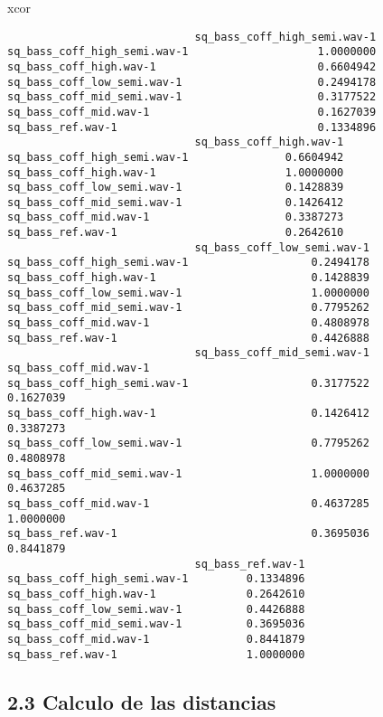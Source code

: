 \documentclass[
]{article}
\newenvironment{Shaded}{\begin{snugshade}}{\end{snugshade}}
\newcommand{\NormalTok}[1]{#1}
\begin{document}
\begin{Shaded}
\begin{Highlighting}[]
\NormalTok{xcor }
\end{Highlighting}
\end{Shaded}

\begin{verbatim}
                             sq_bass_coff_high_semi.wav-1
sq_bass_coff_high_semi.wav-1                    1.0000000
sq_bass_coff_high.wav-1                         0.6604942
sq_bass_coff_low_semi.wav-1                     0.2494178
sq_bass_coff_mid_semi.wav-1                     0.3177522
sq_bass_coff_mid.wav-1                          0.1627039
sq_bass_ref.wav-1                               0.1334896
                             sq_bass_coff_high.wav-1
sq_bass_coff_high_semi.wav-1               0.6604942
sq_bass_coff_high.wav-1                    1.0000000
sq_bass_coff_low_semi.wav-1                0.1428839
sq_bass_coff_mid_semi.wav-1                0.1426412
sq_bass_coff_mid.wav-1                     0.3387273
sq_bass_ref.wav-1                          0.2642610
                             sq_bass_coff_low_semi.wav-1
sq_bass_coff_high_semi.wav-1                   0.2494178
sq_bass_coff_high.wav-1                        0.1428839
sq_bass_coff_low_semi.wav-1                    1.0000000
sq_bass_coff_mid_semi.wav-1                    0.7795262
sq_bass_coff_mid.wav-1                         0.4808978
sq_bass_ref.wav-1                              0.4426888
                             sq_bass_coff_mid_semi.wav-1 sq_bass_coff_mid.wav-1
sq_bass_coff_high_semi.wav-1                   0.3177522              0.1627039
sq_bass_coff_high.wav-1                        0.1426412              0.3387273
sq_bass_coff_low_semi.wav-1                    0.7795262              0.4808978
sq_bass_coff_mid_semi.wav-1                    1.0000000              0.4637285
sq_bass_coff_mid.wav-1                         0.4637285              1.0000000
sq_bass_ref.wav-1                              0.3695036              0.8441879
                             sq_bass_ref.wav-1
sq_bass_coff_high_semi.wav-1         0.1334896
sq_bass_coff_high.wav-1              0.2642610
sq_bass_coff_low_semi.wav-1          0.4426888
sq_bass_coff_mid_semi.wav-1          0.3695036
sq_bass_coff_mid.wav-1               0.8441879
sq_bass_ref.wav-1                    1.0000000
\end{verbatim}

\hypertarget{calculo-de-las-distancias}{%
\subsection{2.3 Calculo de las
distancias}\label{calculo-de-las-distancias}}
\end{document}
